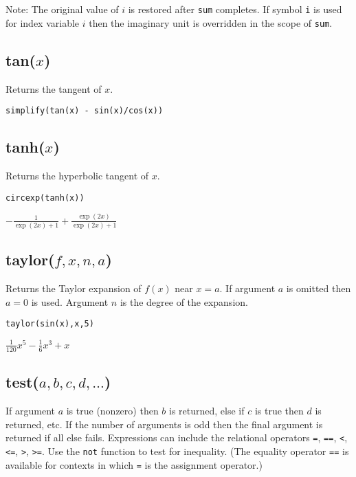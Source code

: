 \bigskip
\noindent
Note: The original value of $i$ is restored after {\tt sum} completes.
If symbol {\tt i} is used for index variable $i$
then the imaginary unit is overridden in the scope of {\tt sum}.

\subsection*{tan($x$)}

Returns the tangent of $x$.

{\color{blue}
\begin{verbatim}
simplify(tan(x) - sin(x)/cos(x))
\end{verbatim}
}


\subsection*{tanh($x$)}

Returns the hyperbolic tangent of $x$.

{\color{blue}
\begin{verbatim}
circexp(tanh(x))
\end{verbatim}
}

\noindent
$\displaystyle -\frac{1}{\exp(2x)+1}+\frac{\exp(2x)}{\exp(2x)+1}$

\subsection*{taylor($f,x,n,a$)}

Returns the Taylor expansion of $f(x)$ near $x=a$.
If argument $a$ is omitted then $a=0$ is used.
Argument $n$ is the degree of the expansion.

{\color{blue}
\begin{verbatim}
taylor(sin(x),x,5)
\end{verbatim}
}

\noindent
$\displaystyle \tfrac{1}{120}x^5-\tfrac{1}{6}x^3+x$

\subsection*{test($a,b,c,d,\ldots$)}

If argument $a$ is true (nonzero) then $b$ is returned, else if $c$ is true then $d$ is returned, etc.
If the number of arguments is odd then the final argument is returned if all else fails.
Expressions can include the relational operators
\verb$=$,
\verb$==$,
\verb$<$,
\verb$<=$,
\verb$>$,
\verb$>=$.
Use the
\verb$not$
function to test for inequality.
(The equality operator
\verb$==$
is available for contexts in which
\verb$=$
is the assignment operator.)

